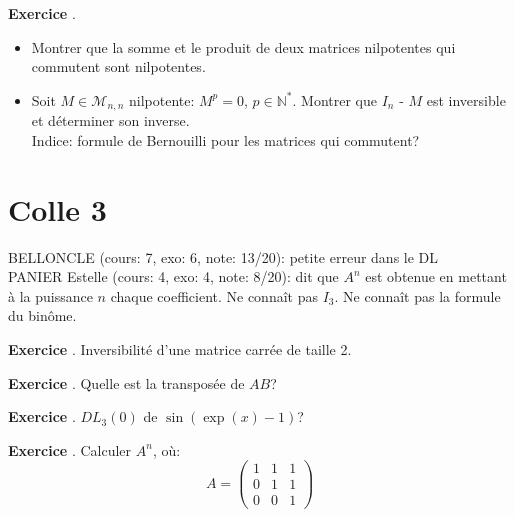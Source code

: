 \documentclass[10pt,a4paper]{article}
\newcounter{question}
\newcounter{exo}
\newenvironment{exo}{\vspace{0.5cm}\setcounter{question}{0}\addtocounter{exo}{1} \noindent \textbf{Exercice \theexo}. \normalsize }{\par}
\begin{document}
	\begin{exo}
		\begin{itemize}
			\item Montrer que la somme et le produit de deux matrices nilpotentes qui commutent sont nilpotentes.
			\item Soit $M \in \mathcal{M}_{n, n}$ nilpotente: $M^p = 0$, $p \in \mathbb{N}^*$. Montrer que $I_n$ - $M$ est inversible et déterminer son inverse. \\
			Indice: formule de Bernouilli pour les matrices qui commutent? 
		\end{itemize}
	\end{exo}
				
	\section*{Colle 3}
	\setcounter{exo}{0}
	BELLONCLE (cours: 7, exo: 6, note: 13/20): petite erreur dans le DL\\
	PANIER Estelle (cours: 4, exo: 4, note: 8/20): dit que $A^n$ est obtenue en mettant à la puissance $n$ chaque coefficient. Ne connaît pas $I_3$. Ne connaît pas la formule du binôme.\\
	
	\begin{exo}
		Inversibilité d'une matrice carrée de taille 2.
	\end{exo}

	\begin{exo}
		Quelle est la transposée de $AB$?
	\end{exo}

	\begin{exo}
		$DL_3(0)$ de $\sin(\exp(x) - 1)$?
	\end{exo}
	
	\begin{exo}
		Calculer $A^n$, où:
		$$A = \begin{pmatrix}
			1 & 1 & 1 \\ 
			0 & 1 & 1 \\ 
			0 & 0 & 1
		\end{pmatrix}$$
	\end{exo}
	
\end{document}
